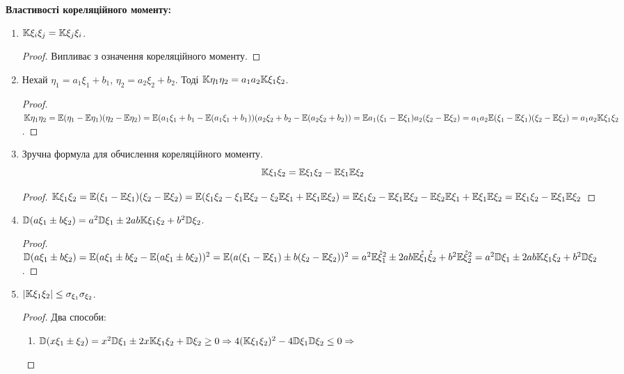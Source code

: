 \noindent \textbf{Властивості кореляційного моменту:}
\begin{enumerate}
    \item $\mathbb{K}\xi_i\xi_j = \mathbb{K}\xi_j\xi_i$.
    \begin{proof}
        Випливає з означення кореляційного моменту.
    \end{proof}
    \item Нехай $\eta_1 = a_1\xi_1 + b_1$, $\eta_2 = a_2\xi_2 + b_2$.
    Тоді $\mathbb{K}\eta_1\eta_2 = a_1a_2\mathbb{K}\xi_1\xi_2$.
    \begin{proof}
        $\mathbb{K}\eta_1\eta_2 = \mathbb{E}(\eta_1 - \mathbb{E}\eta_1)(\eta_2 - \mathbb{E}\eta_2) = 
        \mathbb{E}(a_1\xi_1 + b_1 - \mathbb{E}(a_1\xi_1 + b_1))
        (a_2\xi_2 + b_2 - \mathbb{E}(a_2\xi_2 + b_2)) = 
        \mathbb{E} a_1(\xi_1 - \mathbb{E}\xi_1)a_2(\xi_2 - \mathbb{E}\xi_2) = 
        a_1a_2\mathbb{E}(\xi_1 - \mathbb{E}\xi_1)(\xi_2 - \mathbb{E}\xi_2) = 
        a_1a_2\mathbb{K}\xi_1\xi_2$.
    \end{proof}

    \item Зручна формула для обчислення кореляційного моменту.
    \begin{equation}
        \mathbb{K}\xi_1\xi_2 = \mathbb{E}\xi_1\xi_2 - \mathbb{E}\xi_1 \mathbb{E}\xi_2
    \end{equation}
    \begin{proof}
        $\mathbb{K}\xi_1\xi_2 = \mathbb{E}(\xi_1 - \mathbb{E}\xi_1)(\xi_2 - \mathbb{E}\xi_2) = 
        \mathbb{E}(\xi_1\xi_2 - \xi_1\mathbb{E}\xi_2 - \xi_2\mathbb{E}\xi_1 + \mathbb{E}\xi_1\mathbb{E}\xi_2) = 
        \mathbb{E}\xi_1\xi_2 - \mathbb{E}\xi_1\mathbb{E}\xi_2 - \mathbb{E}\xi_2\mathbb{E}\xi_1 + \mathbb{E}\xi_1\mathbb{E}\xi_2 = 
        \mathbb{E}\xi_1\xi_2 - \mathbb{E}\xi_1\mathbb{E}\xi_2$
    \end{proof}
    
    \item $\mathbb{D}(a\xi_1 \pm b\xi_2) = a^2\mathbb{D}\xi_1 \pm 2ab\mathbb{K}\xi_1\xi_2 + 
    b^2\mathbb{D}\xi_2$.

    \begin{proof}
        $\mathbb{D}(a\xi_1 \pm b\xi_2) = 
        \mathbb{E}(a\xi_1 \pm b\xi_2 - \mathbb{E}(a\xi_1 \pm b\xi_2))^2 =
        \mathbb{E}(a(\xi_1-\mathbb{E}\xi_1)\pm b(\xi_2 - \mathbb{E}\xi_2))^2 = 
        a^2 \mathbb{E}\mathring{\xi}_1^2 \pm 2ab\mathbb{E}\mathring{\xi}_1\mathring{\xi} _2 
        + b^2 \mathbb{E}\mathring{\xi}_2^2 = 
        a^2\mathbb{D}\xi_1 \pm 2ab\mathbb{K}\xi_1\xi_2 + b^2\mathbb{D}\xi_2$.
    \end{proof}

    \item\label{cov_ineq} $\left|\mathbb{K}\xi_1\xi_2\right| \leq \sigma_{\xi_1} \sigma_{\xi_2}$. 
    \begin{proof}
        Два способи: 
        \begin{enumerate}[label=\Roman*.]
            \item $\mathbb{D}(x\xi_1 \pm \xi_2) = x^2 \mathbb{D}\xi_1 \pm 2x\mathbb{K}\xi_1\xi_2 + \mathbb{D}\xi_2 \geq 0 
            \Rightarrow 4(\mathbb{K}\xi_1\xi_2)^2 - 4\mathbb{D}\xi_1\mathbb{D}\xi_2 \leq 0 
            \Rightarrow $


\end{enumerate}
\end{proof}
\end{enumerate}
